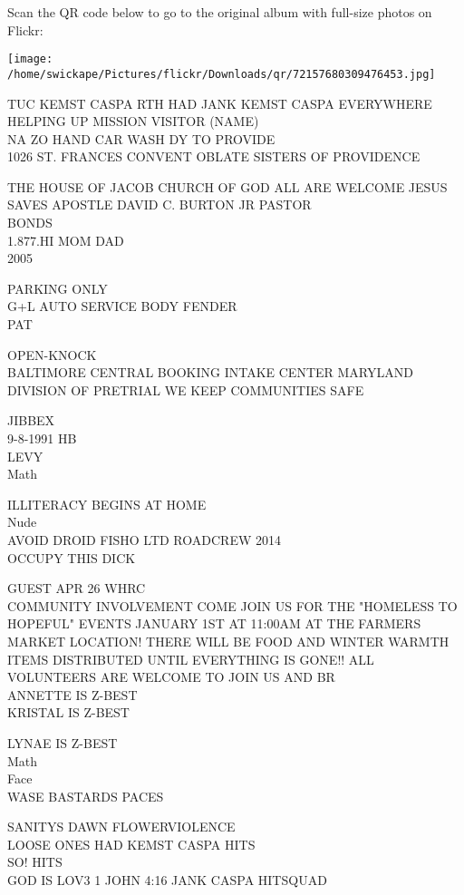 \documentclass[10pt,letterpaper]{article}
\begin{document}
Scan the QR code below to go to the original album with full-size photos on Flickr:

\texttt{[image: /home/swickape/Pictures/flickr/Downloads/qr/72157680309476453.jpg]}


TUC KEMST CASPA RTH HAD JANK KEMST CASPA EVERYWHERE\\
HELPING UP MISSION VISITOR (NAME)\\
NA ZO HAND CAR WASH DY TO PROVIDE\\
1026 ST. FRANCES CONVENT OBLATE SISTERS OF PROVIDENCE

THE HOUSE OF JACOB CHURCH OF GOD ALL ARE WELCOME JESUS SAVES APOSTLE DAVID C. BURTON JR PASTOR\\
BONDS\\
1.877.HI MOM DAD\\
2005

PARKING ONLY\\
G+L AUTO SERVICE BODY FENDER\\
PAT

OPEN{-}KNOCK\\
BALTIMORE CENTRAL BOOKING INTAKE CENTER MARYLAND DIVISION OF PRETRIAL WE KEEP COMMUNITIES SAFE

JIBBEX\\
9{-}8{-}1991 HB\\
LEVY\\
Math

ILLITERACY BEGINS AT HOME\\
Nude\\
AVOID DROID FISHO LTD ROADCREW 2014\\
OCCUPY THIS DICK

GUEST APR 26 WHRC\\
COMMUNITY INVOLVEMENT COME JOIN US FOR THE "HOMELESS TO HOPEFUL" EVENTS JANUARY 1ST AT 11:00AM AT THE FARMERS MARKET LOCATION!  THERE WILL BE FOOD AND WINTER WARMTH ITEMS DISTRIBUTED UNTIL EVERYTHING IS GONE!!  ALL VOLUNTEERS ARE WELCOME TO JOIN US AND BR\\
ANNETTE IS Z{-}BEST\\
KRISTAL IS Z{-}BEST

LYNAE IS Z{-}BEST\\
Math\\
Face\\
WASE BASTARDS PACES

SANITYS DAWN FLOWERVIOLENCE\\
LOOSE ONES HAD KEMST CASPA HITS\\
SO!  HITS\\
GOD IS LOV3 1 JOHN 4:16 JANK CASPA HITSQUAD
\end{document}
